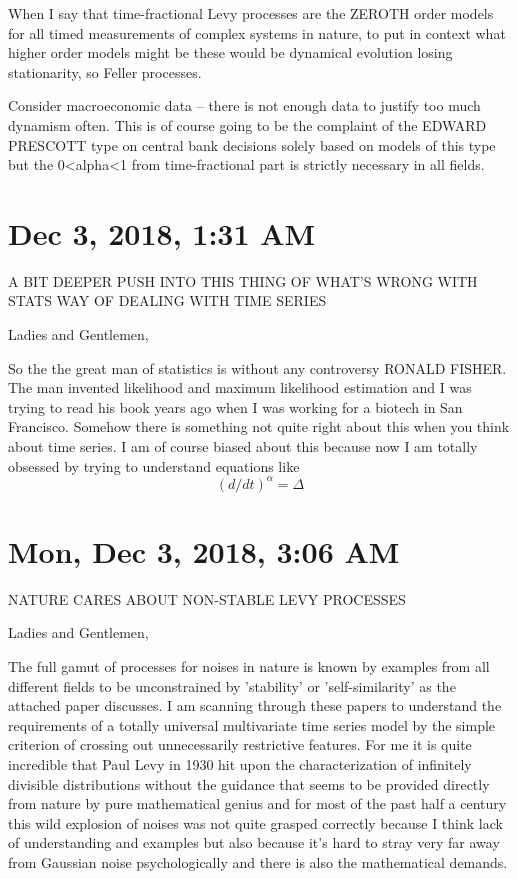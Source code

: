 \documentclass{amsart}
\begin{document}
When I say that time-fractional Levy processes are the ZEROTH order models for all timed measurements of complex systems in nature, to put in context what higher order models might be these would be dynamical evolution losing stationarity, so Feller processes.

Consider macroeconomic data -- there is not enough data to justify too much dynamism often.  This is of course going to be the complaint of the EDWARD PRESCOTT type on central bank decisions solely based on models of this type but the 0<alpha<1 from time-fractional part is strictly necessary in all fields.  

\section{Dec 3, 2018, 1:31 AM}
A BIT DEEPER PUSH INTO THIS THING OF WHAT'S WRONG WITH STATS WAY OF DEALING WITH TIME SERIES

Ladies and Gentlemen,

So the the great man of statistics is without any controversy RONALD FISHER.  The man invented likelihood and maximum likelihood estimation and I was trying to read his book years ago when I was working for a biotech in San Francisco.  Somehow there is something not quite right about this when you think about time series.  I am of course biased about this because now I am totally obsessed by trying to understand equations like
\[
(d/dt)^{\alpha} = \Delta
\]

\section{Mon, Dec 3, 2018, 3:06 AM}
NATURE CARES ABOUT NON-STABLE LEVY PROCESSES

Ladies and Gentlemen,

The full gamut of processes for noises in nature is known by examples from all different fields to be unconstrained by 'stability' or 'self-similarity' as the attached paper discusses.  I am scanning through these papers to understand the requirements of a totally universal multivariate time series model by the simple criterion of crossing out unnecessarily restrictive features.  For me it is quite incredible that Paul Levy in 1930 hit upon the characterization of infinitely divisible distributions without the guidance that seems to be provided directly from nature by pure mathematical genius and for most of the past half a century this wild explosion of noises was not quite grasped correctly because I think lack of understanding and examples but also because it's hard to stray very far away from Gaussian noise psychologically and there is also the mathematical demands.  
\end{document}
